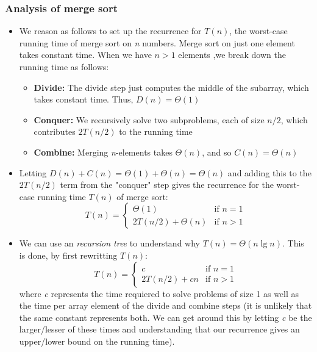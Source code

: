 \documentclass{report}
\begin{document}
\subsubsection*{Analysis of merge sort}
\begin{itemize}
    \item We reason as follows to set up the recurrence for $T(n)$, the worst-case running time of merge sort on \textit{n} numbers. Merge sort on just one element takes constant time. When we have $n > 1$ elements ,we break down the running time as follows:
    \begin{itemize}
        \item \textbf{Divide:} The divide step just computes the middle of the subarray, which takes constant time. Thus, $D(n) = \Theta(1)$
        \item \textbf{Conquer:} We recursively solve two subproblems, each of size $n/2$, which contributes $2T(n/2)$ to the running time
        \item \textbf{Combine:} Merging \textit{n}-elements takes $\Theta(n)$, and so $C(n) = \Theta(n)$
    \end{itemize}
    \item Letting $D(n) + C(n) = \Theta(1) + \Theta(n) = \Theta(n)$ and adding this to the $2T(n/2)$ term from the "conquer" step gives the recurrence for the worst-case running time $T(n)$ of merge sort:
    \[
        T(n) = 
        \begin{cases}
            \Theta(1) & \text{if $n = 1$} \\
            2T(n/2) + \Theta(n) & \text{if $n > 1$}
        \end{cases}    
    \]
    \item We can use an \textit{recursion tree} to understand why $T(n) = \Theta(n \lg n)$. This is done, by first rewritting $T(n)$:
    \[
        T(n) = 
        \begin{cases}
            c & \text{if $n = 1$} \\
            2T(n/2) + cn & \text{if $n > 1$}
        \end{cases}    
    \]
    where \textit{c} represents the time requiered to solve problems of size 1 as well as the time per array element of the divide and combine steps (it is unlikely that the same constant represents both. We can get around this by letting \textit{c} be the larger/lesser of these times and understanding that our recurrence gives an upper/lower bound on the running time).
    \begin{center}

\end{center}
\end{itemize}
\end{document}
